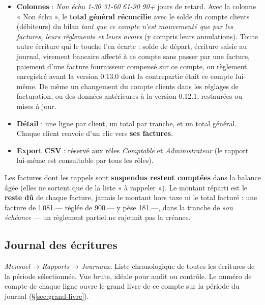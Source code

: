 \documentclass[a4paper,11pt,oneside]{article}
\begin{document}
\begin{itemize}
    \item \textbf{Colonnes} : \emph{Non échu} \textbar{} \emph{1-30} \textbar{} \emph{31-60} \textbar{} \emph{61-90} \textbar{} \emph{90+} jours de retard. Avec la colonne « Non échu », le \textbf{total général réconcilie} avec le solde du compte clients (débiteurs) du bilan \emph{tant que ce compte n'est mouvementé que par les factures, leurs règlements et leurs avoirs} (y compris leurs annulations). Toute autre écriture qui le touche l'en écarte : solde de départ, écriture saisie au journal, virement bancaire affecté à ce compte sans passer par une facture, paiement d'une facture fournisseur compensé sur ce compte, ou règlement enregistré avant la version 0.13.0 dont la contrepartie était ce compte lui-même. De même un changement du compte clients dans les réglages de facturation, ou des données antérieures à la version 0.12.1, restaurées ou mises à jour.
    \item \textbf{Détail} : une ligne par client, un total par tranche, et un total général. Chaque client renvoie d'un clic vers \textbf{ses factures}.
    \item \textbf{Export CSV} : réservé aux rôles \emph{Comptable} et \emph{Administrateur} (le rapport lui-même est consultable par tous les rôles).
\end{itemize}

\begin{keshnote}
Les factures dont les rappels sont \textbf{suspendus restent comptées} dans la balance âgée (elles ne sortent que de la liste « à rappeler »). Le montant réparti est le \textbf{reste dû} de chaque facture, jamais le montant hors taxe ni le total facturé : une facture de 1\,081.--- réglée de 900.--- y pèse 181.---, dans la tranche de \emph{son échéance} --- un règlement partiel ne rajeunit pas la créance.
\end{keshnote}

\subsection{Journal des écritures}

\emph{Mensuel} → \emph{Rapports} → \emph{Journaux}. Liste chronologique de toutes les écritures de la période sélectionnée. Vue brute, idéale pour audit ou contrôle. Le numéro de compte de chaque ligne ouvre le grand livre de ce compte sur la période du journal (\S\ref{sec:grand-livre}).
\end{document}
